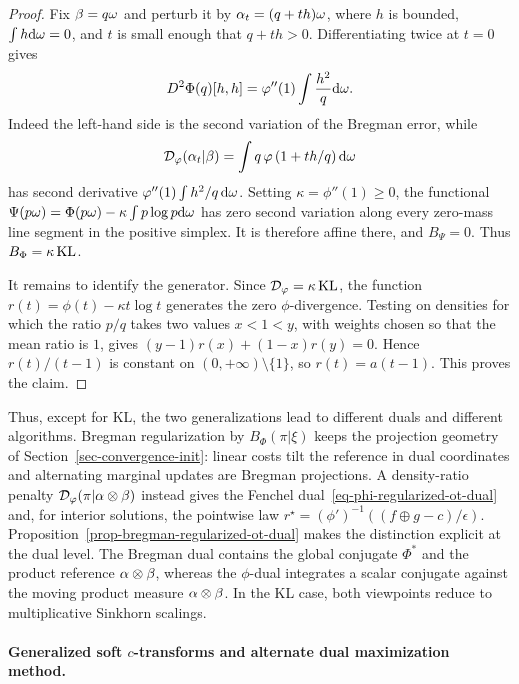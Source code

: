 \begin{proof}
	Fix $\beta=q\omega$ and perturb it by $\alpha_t=(q+t h)\omega$, where $h$ is bounded, $\int h\mathrm{d}\omega=0$, and $t$ is small enough that $q+t h>0$. Differentiating twice at $t=0$ gives
	\[
		D^2\Phi(q)[h,h]
		=
		\varphi''(1)\int \frac{h^2}{q}\mathrm{d}\omega.
	\]
	Indeed the left-hand side is the second variation of the Bregman error, while
	\[
		\mathcal{D}_\varphi(\alpha_t|\beta)
		=
		\int q\,\varphi\left(1+t h/q\right)\mathrm{d}\omega
	\]
	has second derivative $\varphi''(1)\int h^2/q\,\mathrm{d}\omega$. Setting $\kappa=\phi''(1)\geq0$, the functional $\Psi(p\omega)=\Phi(p\omega)-\kappa\int p\log p\mathrm{d}\omega$ has zero second variation along every zero-mass line segment in the positive simplex. It is therefore affine there, and $B_\Psi=0$. Thus $B_\Phi=\kappa\operatorname{KL}$.

	It remains to identify the generator. Since $\mathcal{D}_\varphi=\kappa\operatorname{KL}$, the function $r(t)=\phi(t)-\kappa t\log t$ generates the zero $\phi$-divergence. Testing on densities for which the ratio $p/q$ takes two values $x<1<y$, with weights chosen so that the mean ratio is $1$, gives $(y-1)r(x)+(1-x)r(y)=0$. Hence $r(t)/(t-1)$ is constant on $(0,+\infty)\setminus\{1\}$, so $r(t)=a(t-1)$. This proves the claim.
\end{proof}

Thus, except for KL, the two generalizations lead to different duals and different algorithms. Bregman regularization by $B_\Phi(\pi|\xi)$ keeps the projection geometry of Section~\ref{sec-convergence-init}: linear costs tilt the reference in dual coordinates and alternating marginal updates are Bregman projections. A density-ratio penalty $\mathcal{D}_\varphi(\pi|\alpha\otimes\beta)$ instead gives the Fenchel dual~\eqref{eq-phi-regularized-ot-dual} and, for interior solutions, the pointwise law $r^\star=(\phi')^{-1}((f\oplus g-c)/\epsilon)$. Proposition~\ref{prop-bregman-regularized-ot-dual} makes the distinction explicit at the dual level. The Bregman dual contains the global conjugate $\Phi^*$ and the product reference $\alpha\otimes\beta$, whereas the $\phi$-dual integrates a scalar conjugate against the moving product measure $\alpha\otimes\beta$. In the KL case, both viewpoints reduce to multiplicative Sinkhorn scalings.

\paragraph{Generalized soft $c$-transforms and alternate dual maximization method.}

